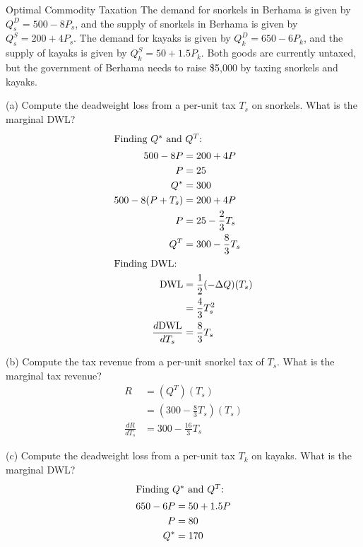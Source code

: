 \documentclass[8pt]{extarticle}
\begin{document}
  \begin{problem}{Optimal Commodity Taxation}
    The demand for snorkels in Berhama is given by $Q^{D}_s = 500 - 8P_s$, and the supply of snorkels in Berhama is given by $Q_{s}^S = 200 + 4P_s$. The demand for kayaks is given by $Q_{k}^D = 650 - 6P_k$, and the supply of kayaks is given by $Q_{k}^{S} = 50 + 1.5P_k$. Both goods are currently untaxed, but the government of Berhama needs to raise \$5,000 by taxing snorkels and kayaks.
    \begin{problem}{(a)}
      Compute the deadweight loss from a per-unit tax $T_s$ on snorkels. What is the marginal DWL?
      \tcblower
      \begin{align*}
        \shortintertext{Finding $Q^*$ and $Q^T$:}
        500 - 8P &= 200 + 4P\\
        P &= 25\\
        Q^{\ast} &= 300\\
        500 - 8(P + T_s) &= 200 + 4P\\
        P &= 25 - \frac{2}{3}T_s\\
        Q^T &= 300 - \frac{8}{3}T_s\\
        \shortintertext{Finding DWL:}
        \text{DWL} &= \frac{1}{2}(-\Delta Q)(T_s)\\
                   &= \frac{4}{3}T_s^2\\
        \frac{d\text{DWL}}{dT_s} &= \frac{8}{3}T_s
      \end{align*}
    \end{problem}
    \begin{problem}{(b)}
      Compute the tax revenue from a per-unit snorkel tax of $T_s$. What is the marginal tax revenue?
      \tcblower
      \begin{align*}
        R &= (Q^T)(T_s)\\
           &= \left(300 - \frac{8}{3}T_s\right)(T_s)\\
        \frac{dR}{dT_s} &= 300 - \frac{16}{3}T_s
      \end{align*}
    \end{problem}
    \begin{problem}{(c)}
      Compute the deadweight loss from a per-unit tax $T_k$ on kayaks. What is the marginal DWL?
      \tcblower
      \begin{align*}
        \shortintertext{Finding $Q^*$ and $Q^T$:}
        650 - 6P &= 50 + 1.5P\\
        P &= 80\\
        Q^{\ast} &= 170\\

\end{align*}
\end{problem}
\end{problem}
\end{document}
